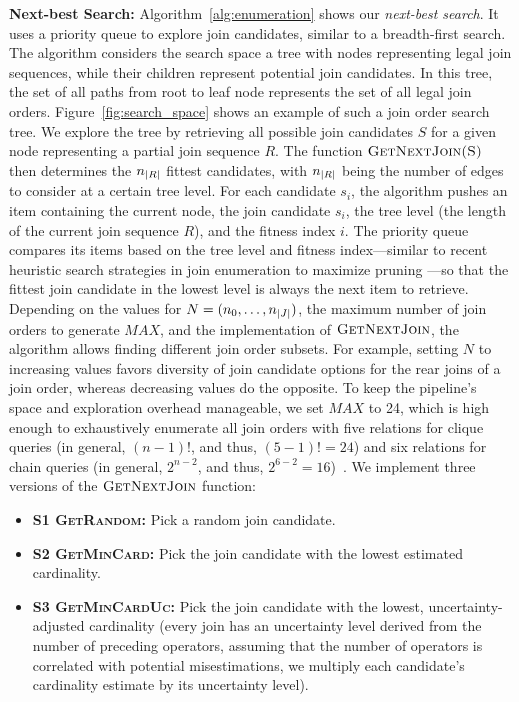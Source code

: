 \textbf{Next-best Search:} Algorithm~\ref{alg:enumeration} shows our \emph{next-best search}. It uses a priority queue to explore join candidates, similar to a breadth-first search. The algorithm considers the search space a tree with nodes representing legal join sequences, while their children represent potential join candidates. In this tree, the set of all paths from root to leaf node represents the set of all legal join orders. Figure~\ref{fig:search_space} shows an example of such a join order search tree. We explore the tree by retrieving all possible join candidates $S$ for a given node representing a partial join sequence $R$. The function $\textsc{GetNextJoin(S)}$ then determines the $n_{\lvert R\rvert}$ fittest candidates, with $n_{\lvert R\rvert}$ being the number of edges to consider at a certain tree level. For each candidate $s_i$, the algorithm pushes an item containing the current node, the join candidate $s_i$, the tree level (\ie the length of the current join sequence $R$), and the fitness index $i$. The priority queue compares its items based on the tree level and fitness index---similar to recent heuristic search strategies in join enumeration to maximize pruning \cite{HaffnerD23}---so that the fittest join candidate in the lowest level is always the next item to retrieve. 
Depending on the values for $N=(n_0, \ldots, n_{\lvert J\rvert})$, the maximum number of join orders to generate $\textit{MAX}$, and the implementation of $\textsc{GetNextJoin}$, the algorithm allows finding different join order subsets. For example, setting $N$ to increasing values favors diversity of join candidate options for the rear joins of a join order, whereas decreasing values do the opposite. To keep the pipeline's space and exploration overhead manageable, we set $\mathit{MAX}$ to 24, which is high enough to exhaustively enumerate all join orders with five relations for clique queries (in general, $(n-1)!$, and thus, $(5-1)!=24$) and six relations for chain queries (in general, $2^{n-2}$, and thus, $2^{6-2}=16$)~\cite{MoerkotteN06}.
We implement three versions of the $\textsc{GetNextJoin}$ function:
\begin{itemize}
\item \textbf{S1 \textsc{GetRandom}:} Pick a random join candidate.
\item \textbf{S2 \textsc{GetMinCard}:} Pick the join candidate with the lowest estimated cardinality.
\item \textbf{S3 \textsc{GetMinCardUc}:} Pick the join candidate with the lowest, uncertainty-adjusted cardinality (every join has an uncertainty level derived from the number of preceding operators, assuming that the number of operators is correlated with potential misestimations, we multiply each candidate's cardinality estimate by its uncertainty level).
\end{itemize}


